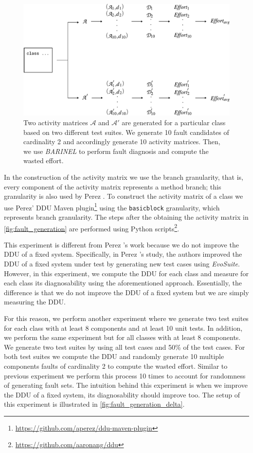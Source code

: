 \documentclass[twoside,a4paper,11pt]{memoir}
\begin{document}
\begin{figure}
  \includegraphics[width=\linewidth]{figures/fault_generation_delta}
  \caption{Two activity matrices $\mathcal{A}$ and $\mathcal{A}'$ are generated for a particular class based on two different test suites. We generate 10 fault candidates of cardinality 2 and accordingly generate 10 activity matrices. Then, we use \emph{BARINEL} to perform fault diagnosis and compute the wasted effort.}
  \label{fig:fault_generation_delta}
\end{figure}

In the construction of the activity matrix we use the branch granularity, that is, every component of the activity matrix represents a method branch; this granularity is also used by Perez \etal \cite{DBLP:conf/icse/PerezAD17}.
To construct the activity matrix of a class we use Perez' DDU Maven plugin\footnote{\url{https://github.com/aperez/ddu-maven-plugin}} using the \texttt{basicblock} granularity, which represents branch granularity.
The steps after the obtaining the activity matrix in \autoref{fig:fault_generation} are performed using Python scripts\footnote{\url{https://github.com/aaronang/ddu}}.

This experiment is different from Perez \etal's work because we do not improve the DDU of a fixed system.
Specifically, in Perez \etal's study, the authors improved the DDU of a fixed system under test by generating new test cases using \emph{EvoSuite}.
However, in this experiment, we compute the DDU for each class and measure for each class its diagnosability using the aforementioned approach.
Essentially, the difference is that we do not improve the DDU of a fixed system but we are simply measuring the DDU.



For this reason, we perform another experiment where we generate two test suites for each class with at least 8 components and at least 10 unit tests.
In addition, we perform the same experiment but for all classes with at least 8 components.
We generate two test suites by using all test cases and 50\% of the test cases.
For both test suites we compute the DDU and randomly generate 10 multiple components faults of cardinality 2 to compute the wasted effort.
Similar to previous experiment we perform this process 10 times to account for randomness of generating fault sets.
The intuition behind this experiment is when we improve the DDU of a fixed system, its diagnosability should improve too.
The setup of this experiment is illustrated in \autoref{fig:fault_generation_delta}.
\end{document}
